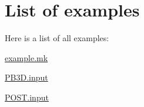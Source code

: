 \section{List of examples}
Here is a list of all examples\+:\begin{DoxyCompactItemize}
\item 
\hyperlink{example_8mk-example}{example.\+mk}
\item 
\hyperlink{PB3D_8input-example}{P\+B3\+D.\+input}
\item 
\hyperlink{POST_8input-example}{P\+O\+S\+T.\+input}
\end{DoxyCompactItemize}
